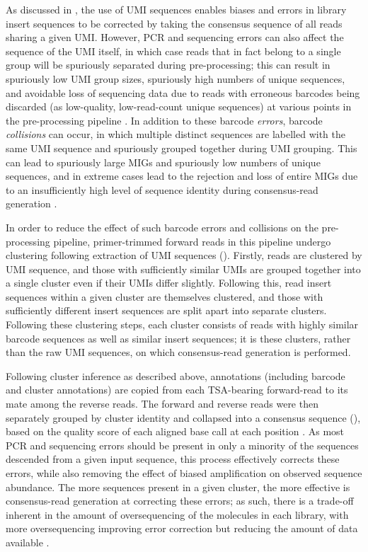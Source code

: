 As discussed in , the use of UMI sequences enables biases and errors in library insert sequences to be corrected by taking the consensus sequence of all reads sharing a given UMI. However, PCR and sequencing errors can also affect the sequence of the UMI itself, in which case reads that in fact belong to a single group will be spuriously separated during pre-processing; this can result in spuriously low UMI group sizes, spuriously high numbers of unique sequences, and avoidable loss of sequencing data due to reads with erroneous barcodes being discarded (as low-quality, low-read-count unique sequences) at various points in the pre-processing pipeline \parencite{shlemov2017igrec}. In addition to these barcode \textit{errors}, barcode \textit{collisions} can occur, in which multiple distinct sequences are labelled with the same UMI sequence and spuriously grouped together during UMI grouping. This can lead to spuriously large MIGs and spuriously low numbers of unique sequences, and in extreme cases lead to the rejection and loss of entire MIGs due to an insufficiently high level of sequence identity during consensus-read generation \parencite{shlemov2017igrec}.

In order to reduce the effect of such barcode errors and collisions on the pre-processing pipeline, primer-trimmed forward reads in this pipeline undergo clustering following extraction of UMI sequences (). Firstly, reads are clustered by UMI sequence, and those with sufficiently similar UMIs are grouped together into a single cluster even if their UMIs differ slightly. Following this, read insert sequences within a given cluster are themselves clustered, and those with sufficiently different insert sequences are split apart into separate clusters. Following these clustering steps, each cluster consists of reads with highly similar barcode sequences as well as similar insert sequences; it is these clusters, rather than the raw UMI sequences, on which consensus-read generation is performed.

Following cluster inference as described above, annotations (including barcode and cluster annotations) are copied from each TSA-bearing forward-read to its mate among the reverse reads. The forward and reverse reads were then separately grouped by cluster identity and collapsed into a consensus sequence (), based on the quality score of each aligned base call at each position \parencite{vanderheiden2014presto}. As most PCR and sequencing errors should be present in only a minority of the sequences descended from a given input sequence, this process effectively corrects these errors, while also removing the effect of biased amplification on observed sequence abundance. The more sequences present in a given cluster, the more effective is consensus-read generation at correcting these errors; as such, there is a trade-off inherent in the amount of oversequencing of the molecules in each library, with more oversequencing improving error correction but reducing the amount of data available \parencite{turchaninova2016igprep}.

